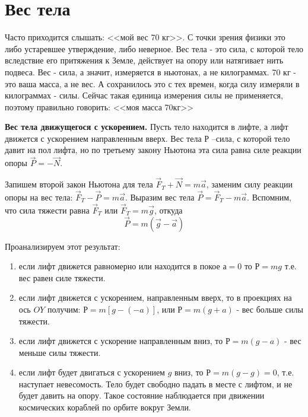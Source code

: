 \documentclass[a5paper, 10pt]{diss_4}
\renewcommand{\'}{\,'}
\begin{document}
\section{Вес тела}

  Часто приходится слышать: <<мой вес 70 кг>>. С точки зрения физики это либо
 устаревшее утверждение, либо неверное. Вес тела - это сила, с которой тело
вследствие его притяжения к Земле, действует на опору или натягивает нить
подвеса. Вес - сила, а значит, измеряется в ньютонах, а не килограммах. 70 кг -
это ваша масса, а не вес. А сохранилось это с тех времен, когда силу измеряли в
килограммах - силы. Сейчас такая единица измерения силы не применяется, поэтому
правильно говорить: <<моя масса 70кг>>

  \textbf{Вес тела движущегося с ускорением.} Пусть тело находится в лифте, а
лифт движется с ускорением направленным вверх. Вес тела $Р$ --сила, с которой
тело давит на пол лифта, но по третьему закону Ньютона эта сила равна силе
реакции опоры $\vec{P}=-\vec{N}$.

  Запишем второй закон Ньютона для тела $\vec{F}_T+\vec{N}=m\vec{a}$, заменим
силу реакции опоры на вес тела: $\vec{F}_T-\vec{P}=m\vec{a}$. Выразим вес тела
 $\vec{P}=\vec{F}_T-m\vec{a}$. Вспомним, что сила тяжести равна $\vec{F}_T$ или
$\vec{F}_T=m\vec{g}$, откуда
\[
\vec{P}=m(\vec{g}-\vec{a})
\]

Проанализируем этот результат:

\begin{enumerate}

  \item если лифт движется равномерно или находится в покое $а=0$ то $Р=mg$
т.е. вес равен силе тяжести.

  \item если лифт движется с ускорением, направленным вверх, то в проекциях на
 ось $OY$ получим: $Р = m\left[g-(-a)\right]$, или $Р=m(g+a)$ - вес больше силы
тяжести.

  \item если лифт движется с ускорение направленным вниз, то $Р = m(g-a)$ -
вес меньше силы тяжести.

  \item если лифт будет двигаться с ускорением $g$ вниз, то $Р = m(g-g)=0$,
т.е. наступает невесомость. Тело будет свободно падать в месте с лифтом, и не
будет давить на опору. Такое состояние наблюдается при движении космических
кораблей по орбите вокруг Земли.

\end{enumerate}
\end{document}
